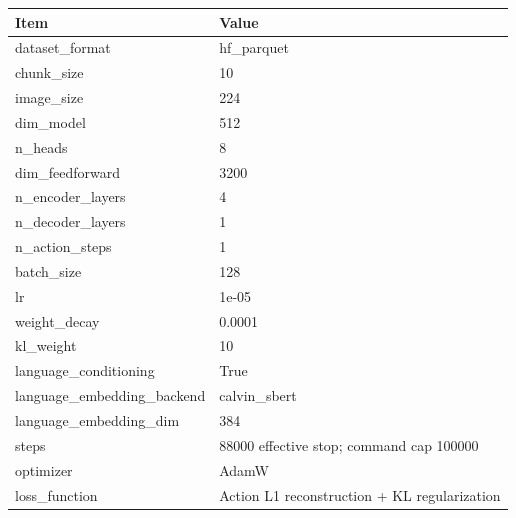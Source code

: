\begin{tabular}{ll}
\toprule
Item & Value \\
\midrule
dataset\_format & hf\_parquet \\
chunk\_size & 10 \\
image\_size & 224 \\
dim\_model & 512 \\
n\_heads & 8 \\
dim\_feedforward & 3200 \\
n\_encoder\_layers & 4 \\
n\_decoder\_layers & 1 \\
n\_action\_steps & 1 \\
batch\_size & 128 \\
lr & 1e-05 \\
weight\_decay & 0.0001 \\
kl\_weight & 10 \\
language\_conditioning & True \\
language\_embedding\_backend & calvin\_sbert \\
language\_embedding\_dim & 384 \\
steps & 88000 effective stop; command cap 100000 \\
optimizer & AdamW \\
loss\_function & Action L1 reconstruction + KL regularization \\
\bottomrule
\end{tabular}
